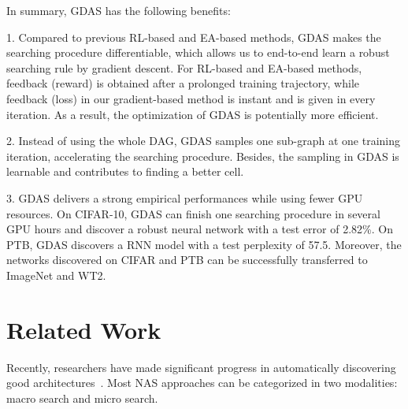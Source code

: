 \documentclass[10pt,twocolumn,letterpaper]{article}
\begin{document}
In summary, GDAS has the following benefits:

1. Compared to previous RL-based and EA-based methods, GDAS makes the searching procedure differentiable, which allows us to end-to-end learn a robust searching rule by gradient descent.
For RL-based and EA-based methods, feedback (reward) is obtained after a prolonged training trajectory, while feedback (loss) in our gradient-based method is instant and is given in every iteration. As a result, the optimization of GDAS is potentially more efficient.



2. Instead of using the whole DAG, GDAS samples one sub-graph at one training iteration, accelerating the searching procedure.
Besides, the sampling in GDAS is learnable and contributes to finding a better cell.


3. GDAS delivers a strong empirical performances while using fewer GPU resources. On CIFAR-10, GDAS can finish one searching procedure in several GPU hours and discover a robust neural network with a test error of 2.82\%. On PTB, GDAS discovers a RNN model with a test perplexity of 57.5. Moreover, the networks discovered on CIFAR and PTB can be successfully transferred to ImageNet and WT2.







\section{Related Work}

Recently, researchers have made significant progress in automatically discovering good architectures~\cite{zoph2017NAS,Zoph_2018_CVPR,liu2018hierarchical,Liu_2018_ECCV,real2017large}. Most NAS approaches can be categorized in two modalities: macro search and micro search.
\end{document}
